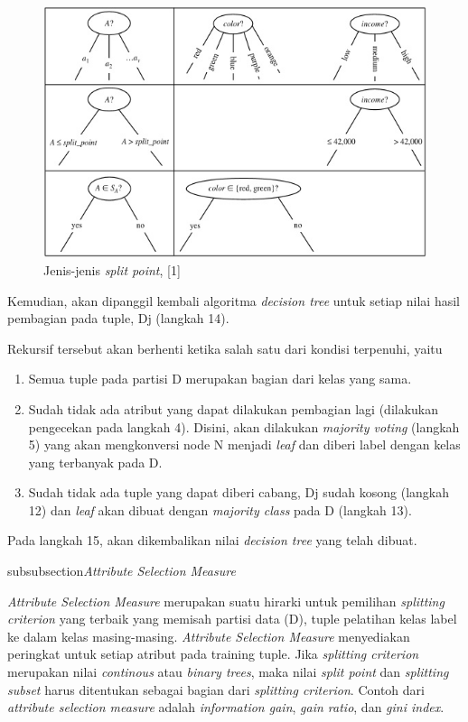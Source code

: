 \begin{figure}
\includegraphics[scale=1]{Gambar/jenishasilsplitpoint.jpg}
\caption[Jenis-jenis \textsl{split point}]{Jenis-jenis \textsl{split point}, [1]} 
\end{figure}

Kemudian, akan dipanggil kembali algoritma \textsl{decision tree} untuk setiap nilai hasil pembagian pada tuple, Dj  (langkah 14).

Rekursif tersebut akan berhenti ketika salah satu dari kondisi terpenuhi, yaitu

\begin{enumerate}
	\item Semua tuple pada partisi D merupakan bagian dari kelas yang sama.
	\item Sudah tidak ada atribut yang dapat dilakukan pembagian lagi (dilakukan pengecekan pada langkah 4). Disini, akan dilakukan \textsl{majority voting} (langkah 5) yang akan mengkonversi node N menjadi \textsl{leaf} dan diberi label dengan kelas yang terbanyak pada D.
	\item Sudah tidak ada tuple yang dapat diberi cabang, Dj sudah kosong (langkah 12) dan \textsl{leaf} akan dibuat dengan \textsl{majority class} pada D (langkah 13).
\end{enumerate}

Pada langkah 15, akan dikembalikan nilai \textsl{decision tree} yang telah dibuat.

subsubsection{\textsl{Attribute Selection Measure}}

\textsl{Attribute Selection Measure} merupakan suatu hirarki untuk pemilihan \textsl{splitting criterion} yang terbaik yang memisah partisi data (D), tuple pelatihan kelas label ke dalam kelas masing-masing. \textsl{Attribute Selection Measure} menyediakan peringkat untuk setiap atribut pada training tuple. Jika \textsl{splitting criterion} merupakan nilai \textsl{continous} atau \textsl{binary trees}, maka nilai \textsl{split point} dan \textsl{splitting subset} harus ditentukan sebagai bagian dari \textsl{splitting criterion}. Contoh dari \textsl{attribute selection measure} adalah \textsl{information gain}, \textsl{gain ratio}, dan \textsl{gini index}.

